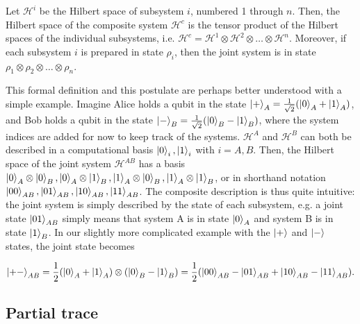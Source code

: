 \begin{postulate} \label{pos:composite}
    Let $\mathcal{H}^i$ be the Hilbert space of subsystem $i$, numbered 1 through $n$. Then, the Hilbert space of the composite system $\mathcal{H}^c$ is the tensor product of the Hilbert spaces of the individual subsystems, i.e. $\mathcal{H}^c = \mathcal{H}^1 \otimes \mathcal{H}^2 \otimes \dots \otimes \mathcal{H}^n$. Moreover, if each subsystem $i$ is prepared in state $\rho_i$, then the joint system is in state $\rho_1 \otimes \rho_2 \otimes \dots \otimes \rho_n$.
\end{postulate}

This formal definition and this postulate are perhaps better understood with a simple example. Imagine Alice holds a qubit in the state $\ket{+}_A = \frac{1}{\sqrt{2}}(\ket{0}_A + \ket{1}_A)$, and Bob holds a qubit in the state $\ket{-}_B = \frac{1}{\sqrt{2}}(\ket{0}_B - \ket{1}_B)$, where the system indices are added for now to keep track of the systems. $\mathcal{H}^A$ and $\mathcal{H}^B$ can both be described in a computational basis $\ket{0}_i, \ket{1}_i$ with $i = A, B$. Then, the Hilbert space of the joint system $\mathcal{H}^{AB}$ has a basis $\ket{0}_A \otimes \ket{0}_B, \ket{0}_A \otimes \ket{1}_B, \ket{1}_A \otimes \ket{0}_B, \ket{1}_A \otimes \ket{1}_B$, or in shorthand notation $\ket{00}_{AB}, \ket{01}_{AB}, \ket{10}_{AB}, \ket{11}_{AB}$. The composite description is thus quite intuitive: the joint system is simply described by the state of each subsystem, e.g. a joint state $\ket{01}_{AB}$ simply means that system A is in state $\ket{0}_A$ and system B is in state $\ket{1}_B$. In our slightly more complicated example with the $\ket{+}$ and $\ket{-}$ states, the joint state becomes

\begin{equation}
    \ket{+-}_{AB} = \frac{1}{2}(\ket{0}_A + \ket{1}_A) \otimes (\ket{0}_B - \ket{1}_B) = \frac{1}{2}(\ket{00}_{AB} - \ket{01}_{AB} + \ket{10}_{AB} - \ket{11}_{AB}).
\end{equation}



\subsection{Partial trace} \label{sec:partial_trace}

